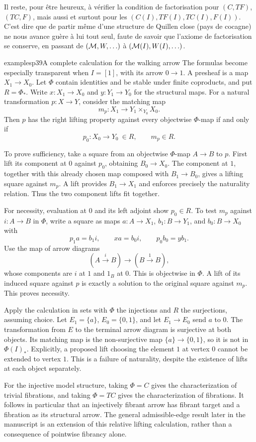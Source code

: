 Il reste, pour être heureux, à vérifier la condition de factorisation  pour $(C,TF)$, $(TC,F)$, mais aussi et surtout pour les $(C(I),TF(I),TC(I),F(I))$. C'est dire que de partir même d'une structure de Quillen close (pays de cocagne)
ne nous avance guère à lui tout seul, faute de savoir que l'axiome de factorisation se conserve, en passant de $(\mathcal{M},W,\ldots)$ à $(\mathcal{M}(I),W(I),\ldots)$.

\begin{dcomment}{examples}{p39}{A complete calculation for the walking arrow}
The formulas become especially transparent when $I=[1]$, with its arrow $0\to1$. A presheaf is a map $X_1\to X_0$. Let $\Phi$ contain identities and be stable under finite coproducts, and put $R=\Phi_*$. Write $x:X_1\to X_0$ and $y:Y_1\to Y_0$ for the structural maps. For a natural transformation $p:X\to Y$, consider the matching map
\[
 m_p:X_1\longrightarrow Y_1\times_{Y_0}X_0.
\]
Then $p$ has the right lifting property against every objectwise $\Phi$-map if and only if
\[
 p_0:X_0\to Y_0\ \in R,
 \qquad m_p\in R.
\]

To prove sufficiency, take a square from an objectwise $\Phi$-map $A\to B$ to $p$. First lift its component at $0$ against $p_0$, obtaining $B_0\to X_0$. The component at $1$, together with this already chosen map composed with $B_1\to B_0$, gives a lifting square against $m_p$. A lift provides $B_1\to X_1$ and enforces precisely the naturality relation. Thus the two component lifts fit together.

For necessity, evaluation at $0$ and its left adjoint show $p_0\in R$. To test $m_p$ against $i:A\to B$ in $\Phi$, write a square as maps $a:A\to X_1$, $b_1:B\to Y_1$, and $b_0:B\to X_0$ with
\[
 p_1a=b_1i,\qquad xa=b_0i,\qquad p_0b_0=yb_1.
\]
Use the map of arrow diagrams
\[
 (A\xrightarrow{i}B)\longrightarrow(B\xrightarrow{1}B),
\]
whose components are $i$ at $1$ and $1_B$ at $0$. This is objectwise in $\Phi$. A lift of its induced square against $p$ is exactly a solution to the original square against $m_p$. This proves necessity.

Apply the calculation in sets with $\Phi$ the injections and $R$ the surjections, assuming choice. Let $E_1=\{a\}$, $E_0=\{0,1\}$, and let $E_1\to E_0$ send $a$ to $0$. The transformation from $E$ to the terminal arrow diagram is surjective at both objects. Its matching map is the non-surjective map $\{a\}\to\{0,1\}$, so it is not in $\Phi(I)_*$. Explicitly, a proposed lift choosing the element $1$ at vertex $0$ cannot be extended to vertex $1$. This is a failure of naturality, despite the existence of lifts at each object separately.

For the injective model structure, taking $\Phi=C$ gives the characterization of trivial fibrations, and taking $\Phi=TC$ gives the characterization of fibrations. It follows in particular that an injectively fibrant arrow has fibrant target and a fibration as its structural arrow. The general admissible-edge result later in the manuscript is an extension of this relative lifting calculation, rather than a consequence of pointwise fibrancy alone.
\end{dcomment}


